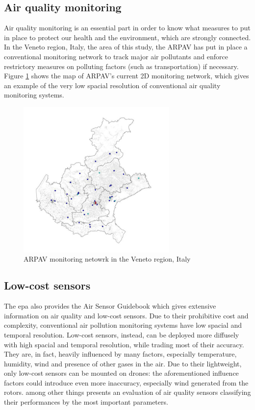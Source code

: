 \subsection{Air quality monitoring}
Air quality monitoring is an essential part in order to know what measures to put in place \cite{who-airquality} to protect our health and the environment, which are strongly connected.
In the Veneto region, Italy, the area of this study, the ARPAV\cite{arpav} has put in place a conventional monitoring network to track major air pollutants and enforce restrictory measures on polluting factors (such as transportation) if necessary. Figure \ref{fig:arpav-map} shows the map of ARPAV's current 2D monitoring network, which gives an example of the very low spacial resolution of conventional air quality monitoring systems.
\begin{figure}[h!]
    \centering
    \includegraphics[width=0.7\textwidth]{images/ARPAV stazioni rete 2019.jpg}
    \caption{ARPAV monitoring netowrk in the Veneto region, Italy\cite{arpav}}
    \label{fig:arpav-map}
\end{figure}
\subsection{Low-cost sensors}
The \gls{epa} also provides the Air Sensor Guidebook\cite{williams2014air} which gives extensive information on air quality and low-cost sensors. Due to their prohibitive cost and complexity, conventional air pollution monitoring systems have low spacial and temporal resolution. Low-cost sensors, instead, can be deployed more diffusely with high spacial and temporal resolution, while trading most of their accuracy. They are, in fact, heavily influenced by many factors, especially temperature, humidity, wind and presence of other gases in the air.  Due to their lightweight, only low-cost sensors can be mounted on drones: the aforementioned influence factors could introduce even more inaccuracy, especially wind generated from the rotors.
\cite{s151229859} among other things presents an evaluation of air quality sensors classifying their performances by the most important parameters.
